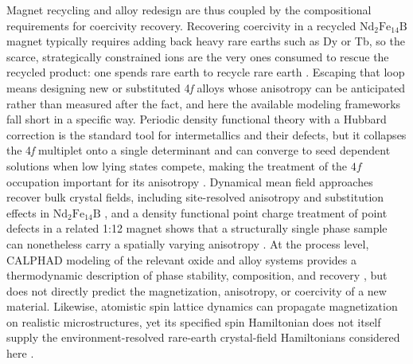 \documentclass[final,1p,times]{elsarticle}
\DeclareRobustCommand{\rev}[1]{{\color{revcolor}#1}}
\newcommand{\ndfeb}{\mathrm{Nd_2Fe_{14}B}}
\begin{document}
Magnet recycling and alloy redesign are thus coupled by the compositional requirements for coercivity recovery. \rev{Recovering coercivity in a recycled $\ndfeb$ magnet typically requires adding back heavy rare earths such as Dy or Tb, so the scarce, strategically constrained ions are the very ones consumed to rescue the recycled product: one spends rare earth to recycle rare earth \cite{binnemans2013,yang2017}.} Escaping that loop means designing new or substituted 4\textit{f} alloys whose anisotropy can be anticipated rather than measured after the fact, and here the available modeling frameworks fall short in a specific way. \rev{Periodic density functional theory with a Hubbard correction is the standard tool for intermetallics and their defects, but it collapses the 4\textit{f} multiplet onto a single determinant and can converge to seed dependent solutions when low lying states compete, making the treatment of the $4f$ occupation important for its anisotropy \cite{dudarev1998,lee2025,ke2025,larson2003}.} \rev{Dynamical mean field approaches recover bulk crystal fields, including site-resolved anisotropy and substitution effects in $\ndfeb$ \cite{delange2017,amadon2006,eryigit2022,boust2022}, and a density functional point charge treatment of point defects in a related 1:12 magnet shows that a structurally single phase sample can nonetheless carry a spatially varying anisotropy \cite{patrick2024}.} At the process level, CALPHAD modeling of the relevant oxide and alloy systems provides a thermodynamic description of phase stability, composition, and recovery \cite{saunders1998,lukas2007,wei2026a,wei2026b}, but does not directly predict the magnetization, anisotropy, or coercivity of a new material. \rev{Likewise, atomistic spin lattice dynamics can propagate magnetization on realistic microstructures, yet its specified spin Hamiltonian does not itself supply the environment-resolved rare-earth crystal-field Hamiltonians considered here \cite{tranchida2018,nitol2026,corvacho2026,murillopolo2026,eriksson2017}.}
\end{document}
